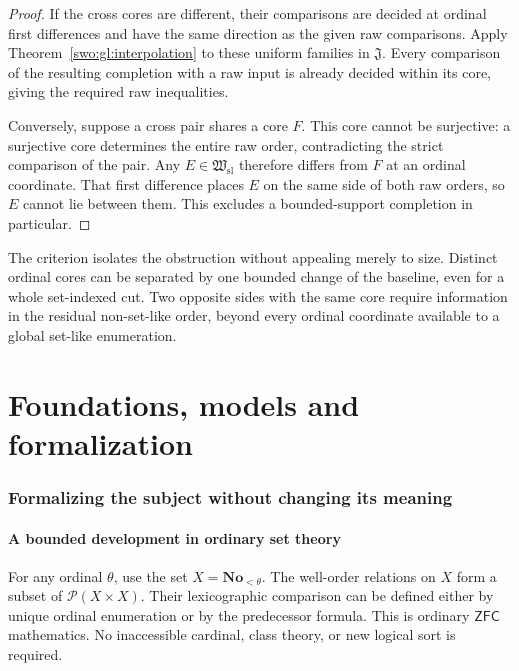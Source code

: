 \documentclass[11pt]{article}
\theoremstyle{definition}
\theoremstyle{remark}
\newcommand{\No}{\mathbf{No}}
\newcommand{\Hsl}{\mathfrak W_{\mathrm{sl}}}
\newcommand{\Jinj}{\mathfrak J}
\newcommand{\ZFC}{\mathsf{ZFC}}
\begin{document}
\begin{proof}
If the cross cores are different, their comparisons are decided at ordinal
first differences and have the same direction as the given raw comparisons.
Apply Theorem~\ref{swo:gl:interpolation} to these uniform families in $\Jinj$.
Every comparison of the resulting completion with a raw input is already
decided within its core, giving the required raw inequalities.

Conversely, suppose a cross pair shares a core $F$.  This core cannot be
surjective: a surjective core determines the entire raw order, contradicting
the strict comparison of the pair.  Any $E\in\Hsl$ therefore differs from
$F$ at an ordinal coordinate.  That first difference places $E$ on the same
side of both raw orders, so $E$ cannot lie between them.  This excludes a
bounded-support completion in particular.
\end{proof}

The criterion isolates the obstruction without appealing merely to size.
Distinct ordinal cores can be separated by one bounded change of the
baseline, even for a whole set-indexed cut.  Two opposite sides with the same
core require information in the residual non-set-like order, beyond every
ordinal coordinate available to a global set-like enumeration.

\part{Foundations, models and formalization}\label{swo:part:models}

\section{Formalizing the subject without changing its meaning}
\label{swo:sec:formalization}

\subsection{A bounded development in ordinary set theory}

For any ordinal \(\theta\), use the set \(X=\No_{<\theta}\).
The well-order relations on \(X\) form a subset of
\(\mathcal P(X\times X)\). Their lexicographic comparison can be
defined either by unique ordinal enumeration or by the predecessor
formula. This is ordinary \(\ZFC\) mathematics. No inaccessible
cardinal, class theory, or new logical sort is required.
\end{document}
